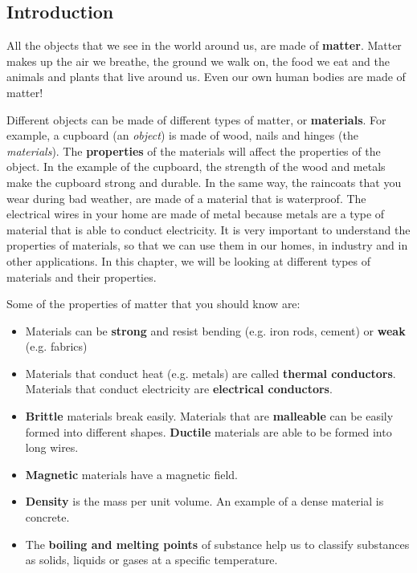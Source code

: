             \subsection{ Introduction}
            \nopagebreak
            \label{m38708*id62175}All the objects that we see in the world around us, are made of \textbf{matter}. Matter makes up the air we breathe, the ground we walk on, the food we eat and the animals and plants that live around us. Even our own human bodies are made of matter!\par 
      \label{m38708*id62185}Different objects can be made of different types of matter, or \textbf{materials}. For example, a cupboard (an \textsl{object}) is made of wood, nails and hinges (the \textsl{materials}). The \textbf{properties} of the materials will affect the properties of the object. In the example of the cupboard, the strength of the wood and metals make the cupboard strong and durable. In the same way, the raincoats that you wear during bad weather, are made of a material that is waterproof. The electrical wires in your home are made of metal because metals are a type of material that is able to conduct electricity. It is very important to understand the properties of materials, so that we can use them in our homes, in industry and in other applications. In this chapter, we will be looking at different types of materials and their properties.\par 
\label{m38708*id0132}Some of the properties of matter that you should know are:
\label{m38708*lid825}\begin{itemize}[noitemsep]
  \item Materials can be \textbf{strong} and resist bending (e.g. iron rods, cement) or \textbf{weak} (e.g. fabrics)
  \item Materials that conduct heat (e.g. metals) are called \textbf{thermal conductors}. Materials that conduct electricity are \textbf{electrical conductors}.
  \item \textbf{Brittle} materials break easily. Materials that are \textbf{malleable} can be easily formed into different shapes. \textbf{Ductile} materials are able to be formed into long wires.
  \item \textbf{Magnetic} materials have a magnetic field.
  \item \textbf{Density} is the mass per unit volume. An example of a dense material is concrete.
  \item The \textbf{boiling and melting points} of substance help us to classify substances as solids, liquids or gases at a specific temperature.\end{itemize}

